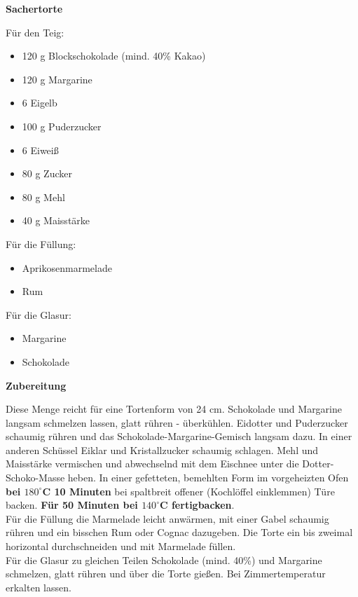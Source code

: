 
\parindent0pt	

\pagestyle{empty}


\textbf{{\LARGE Sachertorte}}%

\hrulefill
\vspace*{\fill}
\begin{multicols}{2}	


Für den Teig:
\begin{itemize}
\item 120 g 	Blockschokolade (mind. 40\% Kakao)
\item 120 g 	Margarine
\item 6  	Eigelb
\item 100 g 	Puderzucker
\item 6  	Eiweiß
\item 80 g 	Zucker
\item 80 g 	Mehl
\item40 g 	Maisstärke
\end{itemize}

Für die Füllung:
\begin{itemize}
\item Aprikosenmarmelade
\item Rum
\end{itemize}
Für die Glasur:
\begin{itemize}
\item Margarine
\item Schokolade 
\end{itemize}

\end{multicols}
\vfill
\newpage
\textbf{{\LARGE Zubereitung}}%

\hrulefill

\vspace*{\fill}
\begin{multicols}{2}


Diese Menge reicht für eine Tortenform von 24 cm.
Schokolade und Margarine langsam schmelzen lassen, glatt rühren - überkühlen.
Eidotter und Puderzucker schaumig rühren und das Schokolade-Margarine-Gemisch langsam dazu. 
In einer anderen Schüssel Eiklar und Kristallzucker schaumig schlagen. 
Mehl und Maisstärke vermischen und abwechselnd mit dem Eischnee unter die Dotter-Schoko-Masse heben.
In einer gefetteten, bemehlten Form im vorgeheizten Ofen \textbf{ bei $180^\circ$C 10 Minuten} bei spaltbreit offener 
(Kochlöffel einklemmen) Türe backen. \textbf{Für 50 Minuten bei $140^\circ$C fertigbacken}.\\

Für die Füllung die Marmelade leicht anwärmen, mit einer Gabel schaumig rühren und ein bisschen Rum oder Cognac dazugeben.
Die Torte ein bis zweimal horizontal durchschneiden und mit Marmelade füllen.\\ 

Für die Glasur zu gleichen Teilen Schokolade (mind. 40\%) und Margarine schmelzen, glatt rühren und über die Torte gießen. 
Bei Zimmertemperatur erkalten lassen.



\end{multicols}
\vfill
